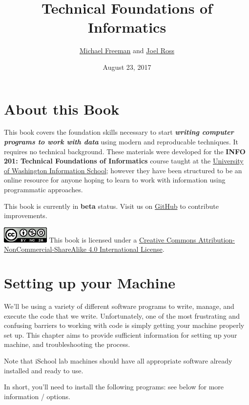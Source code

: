 \documentclass[]{book}
\title{Technical Foundations of Informatics}
\author{\href{http://mfviz.com/\#/}{Michael Freeman} and
\href{http://faculty.washington.edu/joelross/}{Joel Ross}}
\date{August 23, 2017}
\theoremstyle{definition}
\theoremstyle{definition}
\theoremstyle{remark}
\begin{document}
\maketitle

{
\setcounter{tocdepth}{2}
\tableofcontents
}
\chapter*{About this Book}\label{about-this-book}


This book covers the foundation skills necessary to start
\textbf{\emph{writing computer programs to work with data}} using modern
and reproducable techniques. It requires no technical background. These
materials were developed for the \textbf{INFO 201: Technical Foundations
of Informatics} course taught at the
\href{https://ischool.uw.edu/}{University of Washington Information
School}; however they have been structured to be an online resource for
anyone hoping to learn to work with information using programmatic
approaches.

This book is currently in \textbf{beta} status. Visit us on
\href{https://github.com/info201/book}{GitHub} to contribute
improvements.

\includegraphics{img/index/by-nc-sa.png} This book is licensed under a
\href{http://creativecommons.org/licenses/by-nc-sa/4.0/}{Creative
Commons Attribution-NonCommercial-ShareAlike 4.0 International License}.

\hypertarget{setup-machine}{\chapter{Setting up your
Machine}\label{setup-machine}}

We'll be using a variety of different software programs to write,
manage, and execute the code that we write. Unfortunately, one of the
most frustrating and confusing barriers to working with code is simply
getting your machine properly set up. This chapter aims to provide
sufficient information for setting up your machine, and troubleshooting
the process.

Note that iSchool lab machines should have all appropriate software
already installed and ready to use.

In short, you'll need to install the following programs: see below for
more information / options.
\end{document}

